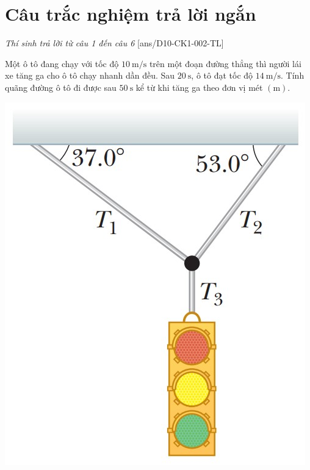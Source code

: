 \section{Câu trắc nghiệm trả lời ngắn} \textit{Thí sinh trả lời từ câu 1 đến câu 6}
\setcounter{ex}{0}
[ans/D10-CK1-002-TL]
\begin{ex}
	Một ô tô đang chạy với tốc độ $\SI{10}{\meter/\second}$ trên một đoạn đường thẳng thì người lái xe tăng ga cho ô tô chạy nhanh dần đều. Sau $\SI{20}{\second}$, ô tô đạt tốc độ $\SI{14}{\meter/\second}$. Tính quãng đường ô tô đi được sau $\SI{50}{\second}$ kể từ khi tăng ga theo đơn vị mét $\left(\si{\meter}\right)$.	
	\loigiai{
		
	}
\end{ex}
\begin{ex}
	{\vspace{-0.5cm}
		\includegraphics[scale=0.3]{figs/D10-CK1-002-4}}
	\loigiai{
		
	}
\end{ex}
